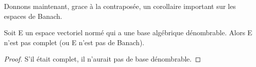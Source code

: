Donnons maintenant, grace à la contraposée, un corollaire important sur les espaces de
Banach.

\begin{corollary}
	Soit E un espace vectoriel normé qui a une base algébrique dénombrable.
	Alors E n'est pas complet (ou E n'est pas de Banach).
\end{corollary}

\ifdefined\outputproof
\begin{proof}
	S'il était complet, il n'aurait pas de base dénombrable.
\end{proof}
\fi
